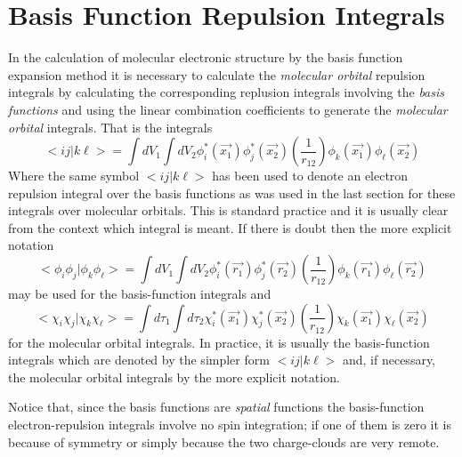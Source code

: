 \section{\sf Basis Function Repulsion Integrals}
In the calculation of molecular electronic structure by the
basis function expansion method it is necessary to calculate
the {\em molecular orbital} repulsion integrals by calculating the
corresponding replusion integrals involving the {\em basis
functions} and using the linear combination coefficients to
generate the {\em molecular orbital} integrals. That is the integrals
\begin{equation}
 < i j | k \ell > = 
\int { dV_1 \int { dV_2 \phi_i^* (\vec{x_1})\phi_j^* (\vec{x_2})
\left ( \frac{1}{r_{12}} \right )
\phi_k (\vec{x_1})\phi_{\ell} (\vec{x_2}) } }
\end{equation}
Where the same symbol $< i j | k \ell > $ has been used to denote
an electron repulsion integral over the basis functions as was used
in the last section for these integrals over molecular orbitals. This is
standard practice and it is usually clear from the context
which integral is meant. If there is doubt then the more
explicit notation
\begin{equation}
 < \phi_i \phi_j | \phi_k \phi_{\ell} > = 
\int { dV_1 \int { dV_2 \phi_i^* (\vec{r_1})\phi_j^* (\vec{r_2})
\left ( \frac{1}{r_{12}} \right )
\phi_k (\vec{r_1})\phi_{\ell} (\vec{r_2}) } }
\end{equation}
may be used for the basis-function integrals and
\begin{equation}
 < \chi_i \chi_j | \chi_k \chi_{\ell} > = 
\int { d\tau_1 \int { d\tau_2 \chi_i^* (\vec{x_1})\chi_j^* (\vec{x_2})
\left ( \frac{1}{r_{12}} \right )
\chi_k (\vec{x_1})\chi_{\ell} (\vec{x_2}) } }
\label{ijklfull}
\end{equation}
for the molecular orbital integrals. In practice, it is usually
the basis-function integrals which are denoted by the simpler
form $< i j | k \ell > $ and, if necessary, the molecular orbital integrals
by the more explicit notation.

Notice that, since the basis functions are {\em spatial} functions
the basis-function electron-repulsion integrals involve no
spin integration; if one of them is zero it is because of
symmetry or simply because the two charge-clouds are very remote.
